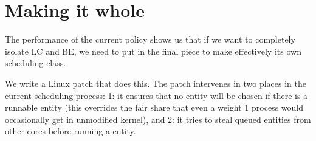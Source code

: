 
\chapter{Making it whole}

The performance of the current \schedidle{} policy shows us that if we want to
completely isolate LC and BE, we need to put in the final piece to make
\schedidle{} effectively its own scheduling class.

We write a Linux patch that does this. The patch intervenes in two places in the
current scheduling process: 1: it ensures that no \schedidle{} entity will be
chosen if there is a runnable \schednormal{} entity (this overrides the fair
share that even a weight 1 process would occasionally get in unmodified kernel),
and 2: it tries to steal queued \schednormal{} entities from other cores before
running a \schedidle{} entity.

